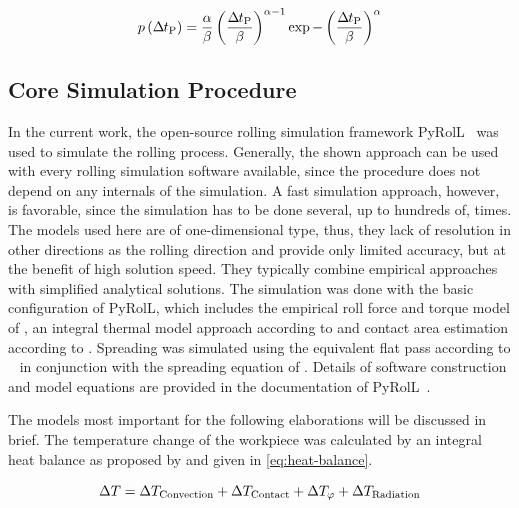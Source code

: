 \begin{equation}
    p\left(\Delta\mspace{-1mu}t_\mathrm{P} \right)=\frac{\alpha}{\beta} \left(\frac{\Delta\mspace{-1mu}t_\mathrm{P}}{\beta}\right)^{\alpha-1}\exp -\left(\frac{\Delta\mspace{-1mu}t_\mathrm{P}}{\beta} \right)^{\alpha}
    \label{eq:weibull-dist}
\end{equation}

\subsection{Core Simulation Procedure}\label{subsec:simulation-procedure}

In the current work, the open-source rolling simulation framework PyRolL~\cite{pyroll_jors, pyroll2.1} was used to simulate the rolling process.
Generally, the shown approach can be used with every rolling simulation software available, since the procedure does not depend on any internals of the simulation.
A fast simulation approach, however, is favorable, since the simulation has to be done several, up to hundreds of, times.
The models used here are of one-dimensional type, thus, they lack of resolution in other directions as the rolling direction and provide only limited accuracy, but at the benefit of high solution speed.
They typically combine empirical approaches with simplified analytical solutions.
The simulation was done with the basic configuration of PyRolL, which includes the empirical roll force and torque model of \textcite{Hensel1978}, an integral thermal model approach according to \textcite{Hensel1990} and contact area estimation according to \textcite{Zouhar1960}.
Spreading was simulated using the equivalent flat pass according to \citeauthor*{Lendl1948}~\cite{Lendl1948, Lendl1948a, Lendl1949} in conjunction with the spreading equation of \textcite{Wusatowski1969}.
Details of software construction and model equations are provided in the documentation of PyRolL~\cite{pyroll2.1}.

The models most important for the following elaborations will be discussed in brief.
The temperature change of the workpiece was calculated by an integral heat balance as proposed by \textcite{Hensel1990} and given in \autoref{eq:heat-balance}.

\begin{equation}
    \Delta T = \Delta T_\mathrm{Convection} + \Delta T_\mathrm{Contact} + \Delta T_{\varphi} + \Delta T_\mathrm{Radiation}
    \label{eq:heat-balance}
\end{equation}

